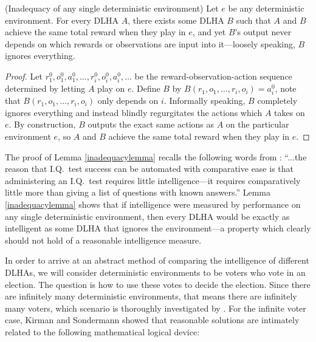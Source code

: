 \documentclass[twoside,11pt]{article}
\begin{document}
\begin{lemma}
\label{inadequacylemma}
    (Inadequacy of any single deterministic environment)
    Let $e$ be any deterministic environment.
    For every DLHA $A$, there exists some DLHA $B$ such that $A$ and $B$ achieve
    the same total reward when they play in $e$, and yet $B$'s output never
    depends on which rewards or observations are input into it---loosely speaking,
    $B$ ignores everything.
\end{lemma}

\begin{proof}
    Let $r^0_1,o^0_1,a^0_1,\ldots,r^0_i,o^0_i,a^0_i,\ldots$ be the
    reward-observation-action sequence determined by letting $A$ play on $e$.
    Define $B$ by $B(r_1,o_1,\ldots,r_i,o_i)=a^0_i$, note that
    $B(r_1,o_1,\ldots,r_i,o_i)$ only depends on $i$. Informally speaking, $B$
    completely ignores everything and instead blindly regurgitates the actions
    which $A$ takes on $e$. By construction, $B$ outputs the exact same actions
    as $A$ on the particular environment $e$, so $A$ and $B$ achieve the same
    total reward when they play in $e$.
\end{proof}

The proof of Lemma \ref{inadequacylemma} recalls the following words from
\citet{sanghi2003computer}: ``...the reason that I.Q.\ test success can be
automated with comparative ease is that administering an I.Q.\ test requires
little intelligence---it requires comparatively little more than
giving a list of questions with known answers.''
Lemma \ref{inadequacylemma} shows that if intelligence were measured by performance
on any single deterministic environment, then every DLHA would be exactly as intelligent
as some DLHA that ignores the environment---a property which clearly should not hold of
a reasonable intelligence measure.

In order to arrive at an abstract method of comparing the intelligence of different
DLHAs, we will consider deterministic environments to be voters who vote in an election.
The question is how to use these votes to decide the election.
Since there are infinitely many deterministic environments, that means there are
infinitely many voters,
which scenario is thoroughly investigated by \citet{kirman}.
For the infinite voter case, Kirman and Sondermann showed that
reasonable solutions are intimately
related to the following mathematical logical device:
\end{document}
